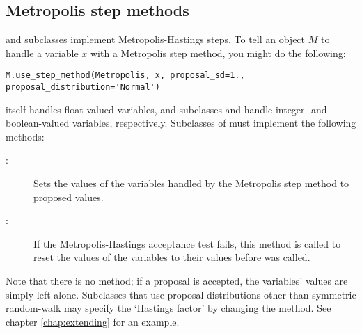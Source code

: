 \hypertarget{metropolis}{}
\subsection{Metropolis step methods} \label{metropolis}

 and subclasses implement Metropolis-Hastings steps. To tell an  object $M$ to handle a variable $x$ with a Metropolis step method, you might do the following:
\begin{verbatim}
M.use_step_method(Metropolis, x, proposal_sd=1., proposal_distribution='Normal')
\end{verbatim}

 itself handles float-valued variables, and subclasses  and  handle integer- and boolean-valued variables, respectively. Subclasses of  must implement the following methods:
\begin{description}
    \item[:] Sets the values of the variables handled by the Metropolis step method to proposed values.
    \item[:] If the Metropolis-Hastings acceptance test fails, this method is called to reset the values of the variables to their values before  was called.
\end{description}
Note that there is no  method; if a proposal is accepted, the variables' values are simply left alone. Subclasses that use proposal distributions other than symmetric random-walk may specify the `Hastings factor' by changing the  method. See chapter \ref{chap:extending} for an example.

